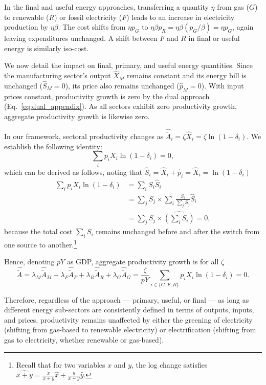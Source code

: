 \documentclass[11pt]{article}
\begin{document}
In the final and useful energy approaches, transferring a quantity $\eta$ from gas ($G$) to renewable ($R$) or fossil electricity ($F$) leads to an increase in electricity production by $\eta\beta$. The cost shifts from $\eta p_G$ to $\eta\beta p_R = \eta\beta (p_G/\beta) = \eta p_G$, again leaving expenditures unchanged. A shift between $F$ and $R$ in final or useful energy is similarly iso-cost.

We now detail the impact on final, primary, and useful energy quantities. Since the manufacturing sector's output $\hat{X}_M$ remains constant and its energy bill is unchanged ($\hat{S}_M = 0$), its price also remains unchanged ($\hat{p}_M = 0$). With input prices constant, productivity growth is zero by the dual approach (Eq.~\eqref{eq:dual_appendix}). As all sectors exhibit zero productivity growth, aggregate productivity growth is likewise zero.

\vspace{3mm}

In our framework, sectoral productivity changes as $\hat{\tilde{A}}_i = \zeta\hat{X}_i=\zeta \ln(1-\delta_i)$. We establish the following identity:
\[
\sum_i p_i X_i \ln(1-\delta_i) = 0,
\]
which can be derived as follows, noting that $\hat{S}_i=\hat{X}_i+\hat{p}_i=\hat{X}_i=\ln(1-\delta_i) $
\begin{equation}
\label{eq_weighted_share_change_cost}
\begin{aligned}
\sum_i p_i X_i \ln(1-\delta_i) 
&= \sum_i S_i \hat{S}_i \\
&= \sum_j S_j\times  \sum_i \frac{S_i}{\sum_j S_j} \hat{S}_i \\
&= \sum_j S_j\times  \widehat{\left(\sum_i S_i\right)} = 0,
\end{aligned}
\end{equation}
because the total cost $\sum_i S_i$ remains unchanged before and after the switch from one source to another.\footnote{
Recall that for two variables $x$ and $y$, the log change satisfies $\widehat{x+y} = \frac{x}{x+y} \hat{x} + \frac{y}{x+y} \hat{y}$.
}

\noindent Hence, denoting $pY$ as GDP, aggregate productivity growth is for all $\zeta$
\[
\hat{\tilde{A}} = \lambda_M \hat{\tilde{A}}_M + \lambda_F \hat{\tilde{A}}_F + \lambda_R \hat{\tilde{A}}_R + \lambda_G \hat{\tilde{A}}_G = \frac{\zeta}{pY} \sum_{i\in\{G,F,R\}} p_i X_i \ln(1-\delta_i) = 0.
\]

\vspace{3mm}

Therefore, regardless of the approach — primary, useful, or final — as long as different energy sub-sectors are consistently defined in terms of outputs, inputs, and prices, productivity remains unaffected by either the greening of electricity (shifting from gas-based to renewable electricity) or electrification (shifting from gas to electricity, whether renewable or gas-based).
\end{document}
